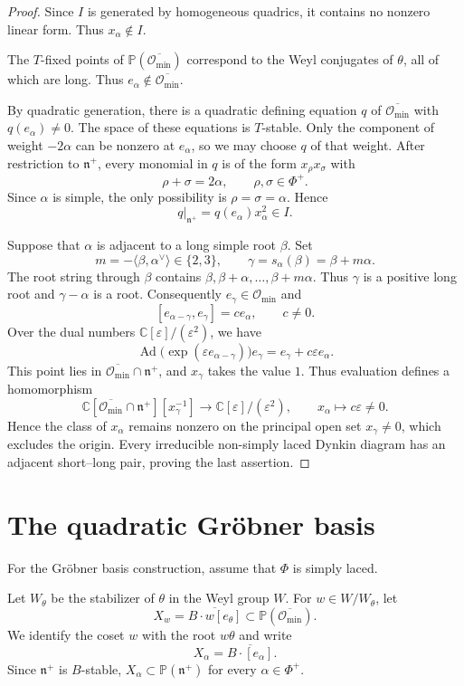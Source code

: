 \documentclass[12pt]{article}
\theoremstyle{definition}
\DeclareMathOperator{\Ad}{Ad}
\newcommand{\C}{\mathbb C}
\newcommand{\n}{\mathfrak n^{+}}
\newcommand{\omin}{\mathcal O_{\min}}
\newcommand{\oc}{\overline{\mathcal O_{\min}}}
\newcommand{\PP}{\mathbb P}
\begin{document}
\begin{proof}
    Since $I$ is generated by homogeneous quadrics, it contains no nonzero linear form. Thus $x_\alpha\notin I$.

    The $T$-fixed points of $\PP(\oc)$ correspond to the Weyl conjugates of $\theta$, all of which are long. Thus $e_\alpha\notin\oc$.

    By quadratic generation, there is a quadratic defining equation $q$ of $\oc$ with $q(e_\alpha)\neq0$. The space of these equations is $T$-stable. Only the component of weight $-2\alpha$ can be nonzero at $e_\alpha$, so we may choose $q$ of that weight. After restriction to $\n$, every monomial in $q$ is of the form $x_\rho x_\sigma$ with
    $$
        \rho+\sigma=2\alpha,\qquad\rho,\sigma\in\Phi^+.
    $$
    Since $\alpha$ is simple, the only possibility is $\rho=\sigma=\alpha$. Hence
    $$
        q|_{\n}=q(e_\alpha)x_\alpha^2\in I.
    $$

    Suppose that $\alpha$ is adjacent to a long simple root $\beta$. Set
    $$
        m=-\langle\beta,\alpha^\vee\rangle\in\{2,3\},
        \qquad \gamma=s_\alpha(\beta)=\beta+m\alpha.
    $$
    The root string through $\beta$ contains $\beta,\beta+\alpha,\ldots,\beta+m\alpha$. Thus $\gamma$ is a positive long root and $\gamma-\alpha$ is a root. Consequently $e_\gamma\in\omin$ and
    $$
        [e_{\alpha-\gamma},e_\gamma]=c e_\alpha,\qquad c\ne0.
    $$
    Over the dual numbers $\C[\varepsilon]/(\varepsilon^2)$, we have
    $$
        \Ad\bigl(\exp(\varepsilon e_{\alpha-\gamma})\bigr)e_\gamma
        =e_\gamma+c\varepsilon e_\alpha.
    $$
    This point lies in $\oc\cap\n$, and $x_\gamma$ takes the value $1$. Thus evaluation defines a homomorphism
    \[
        \C[\oc\cap\n][x_\gamma^{-1}]\longrightarrow\C[\varepsilon]/(\varepsilon^2),
        \qquad x_\alpha\longmapsto c\varepsilon\ne0.
    \]
    Hence the class of $x_\alpha$ remains nonzero on the principal open set $x_\gamma\ne0$, which excludes the origin. Every irreducible non-simply laced Dynkin diagram has an adjacent short--long pair, proving the last assertion.
\end{proof}

\section{The quadratic Gr\"obner basis}

For the Gr\"obner basis construction, assume that $\Phi$ is simply laced.

Let $W_\theta$ be the stabilizer of $\theta$ in the Weyl group $W$. For $w\in W/W_\theta$, let
$$
    X_w=\overline{B\cdot w[e_\theta]}\subset\PP(\oc).
$$
We identify the coset $w$ with the root $w\theta$ and write
$$
    X_\alpha=\overline{B\cdot[e_\alpha]}.
$$
Since $\n$ is $B$-stable, $X_\alpha\subset\PP(\n)$ for every $\alpha\in\Phi^+$.
\end{document}
